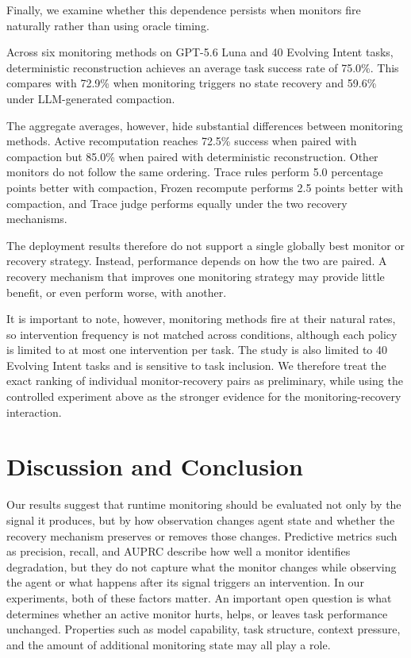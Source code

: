 \documentclass{article}
\begin{document}
Finally, we examine whether this dependence persists when monitors fire naturally rather than using oracle timing.

Across six monitoring methods on GPT-5.6 Luna and 40 Evolving Intent tasks, deterministic reconstruction achieves an average task success rate of 75.0\%. This compares with 72.9\% when monitoring triggers no state recovery and 59.6\% under LLM-generated compaction.

The aggregate averages, however, hide substantial differences between monitoring methods. Active recomputation reaches 72.5\% success when paired with compaction but 85.0\% when paired with deterministic reconstruction. Other monitors do not follow the same ordering. Trace rules perform 5.0 percentage points better with compaction, Frozen recompute performs 2.5 points better with compaction, and Trace judge performs equally under the two recovery mechanisms.

The deployment results therefore do not support a single globally best monitor or recovery strategy. Instead, performance depends on how the two are paired. A recovery mechanism that improves one monitoring strategy may provide little benefit, or even perform worse, with another.

It is important to note, however, monitoring methods fire at their natural rates, so intervention frequency is not matched across conditions, although each policy is limited to at most one intervention per task. The study is also limited to 40 Evolving Intent tasks and is sensitive to task inclusion. We therefore treat the exact ranking of individual monitor-recovery pairs as preliminary, while using the controlled experiment above as the stronger evidence for the monitoring-recovery interaction.

\section{Discussion and Conclusion}

Our results suggest that runtime monitoring should be evaluated not only by the signal it produces, but by how observation changes agent state and whether the recovery mechanism preserves or removes those changes. Predictive metrics such as precision, recall, and AUPRC describe how well a monitor identifies degradation, but they do not capture what the monitor changes while observing the agent or what happens after its signal triggers an intervention. In our experiments, both of these factors matter. An important open question is what determines whether an active monitor hurts, helps, or leaves task performance unchanged. Properties such as model capability, task structure, context pressure, and the amount of additional monitoring state may all play a role.
\end{document}
